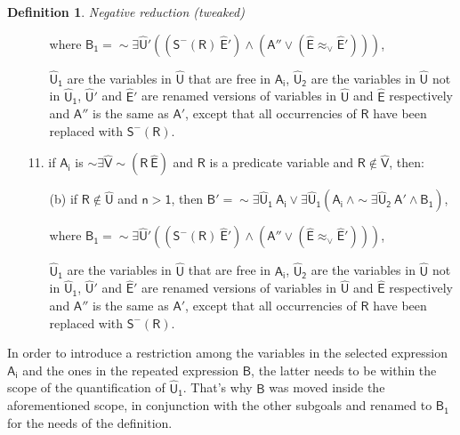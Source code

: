 \documentclass[inscr,ack,preface]{dithesis}
\theoremstyle{definition}
\newtheorem{definition}{Definition}[]
\newcommand{\msf}[1]{$\mathsf{#1}$}
\begin{document}
\begin{definition}{\emph{Negative reduction (tweaked)}}
\begin{enumerate}
\begin{enumerate}
                where \msf{B_{1} = \sim\exists \widehat{U}' \left( \left( S^{-}\left( R \right) ~\widehat{E}' \right) \land \left( A'' \lor \left( \widehat{E} \approx_{\lor} \widehat{E}' \right) \right) \right)},

                \msf{\widehat{U}_1} are the variables in \msf{\widehat{U}} that are free in \msf{A_i}, \msf{\widehat{U}_2} are the variables in \msf{\widehat{U}} not in \msf{\widehat{U}_1}, \msf{\widehat{U}'} and \msf{\widehat{E}'} are renamed versions of variables in \msf{\widehat{U}} and \msf{\widehat{E}} respectively and \msf{A''} is the same as \msf{A'}, except that all occurrencies of \msf{R} have been replaced with \msf{S^{-}(R)}.
        \end{enumerate}
  \item[11.] if \msf{A_i} is \msf{\sim \exists \widehat{V} \sim \left( R ~ \widehat{E} \right)} and \msf{R} is a predicate variable and \msf{R \not\in \widehat{V}}, then:
        \begin{enumerate}
          \item[(b)] if \msf{R \not\in \widehat{U}} and \msf{n > 1},
                then \msf{B' = \sim \exists \widehat{U}_1 ~ A_i \lor \exists \widehat{U}_1 \left( A_i ~ \land \sim \exists \widehat{U}_2 ~ A' \land B_{1} \right)},

                where \msf{B_{1} = \sim\exists \widehat{U}' \left( \left( S^{-}\left( R \right) ~\widehat{E}' \right) \land \left( A'' \lor \left( \widehat{E} \approx_{\lor} \widehat{E}' \right) \right) \right)},

                \msf{\widehat{U}_1} are the variables in \msf{\widehat{U}} that are free in \msf{A_i}, \msf{\widehat{U}_2} are the variables in \msf{\widehat{U}} not in \msf{\widehat{U}_1}, \msf{\widehat{U}'} and \msf{\widehat{E}'} are renamed versions of variables in \msf{\widehat{U}} and \msf{\widehat{E}} respectively and \msf{A''} is the same as \msf{A'}, except that all occurrencies of \msf{R} have been replaced with \msf{S^{-}(R)}.
        \end{enumerate}
\end{enumerate}
\end{definition}

In order to introduce a restriction among the variables in the selected expression \msf{A_i} and the ones in the repeated expression \msf{B}, the latter needs to be within the scope of the quantification of \msf{\widehat{U}_1}. That's why \msf{B} was moved inside the aforementioned scope, in conjunction with the other subgoals and renamed to \msf{B_1} for the needs of the definition.
\end{document}
